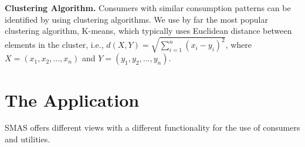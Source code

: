 \documentclass{sig-alternate}
\newcommand{\ie}{i.e.}
\begin{document}

{\bf Clustering Algorithm.} Consumers with similar consumption patterns can be identified by using  clustering algorithms. We use by far the most popular clustering algorithm, K-means, which typically uses Euclidean distance between elements in the cluster, \ie, $d(X, Y)= \sqrt{\sum_{i=1}^{n}(x_i-y_i)^2}$, where $X=(x_1, x_2, ..., x_n)$ and $Y=(y_1, y_2, ..., y_n)$.



\section{The Application}
SMAS offers  different views with a different functionality for the use of consumers and utilities.
\end{document}
